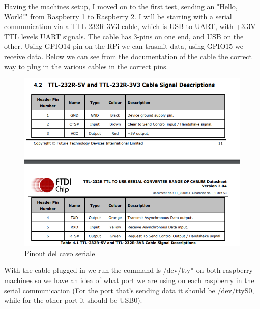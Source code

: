 \documentclass[a4paper,11pt]{scrartcl}
\begin{document}
Having the machines setup, I moved on to the first test, sending an "Hello, World!" from Raspberry 1 to Raspberry 2. I will be starting with a serial communication via a TTL-232R-3V3 cable, which is USB to UART, with +3.3V TTL levels UART signals. The cable has 3-pins on one end, and USB on the other. Using GPIO14 pin on the RPi we can trasmit data, using GPIO15 we receive data. 
Below we can see from the documentation of the cable the correct way to plug in the various cables in the correct pins.
\begin{figure}[htbp]
\centerline{\includegraphics{pinout uart.png}}
\caption{Pinout del cavo seriale}
\label{fig2}
\end{figure}

With the cable plugged in we run the command ls /dev/tty* on both raspberry machines so we have an idea of what port we are using on each raspberry in the serial communication (For the port that's sending data it should be /dev/ttyS0, while for the other port it should be USB0).




\end{document}
